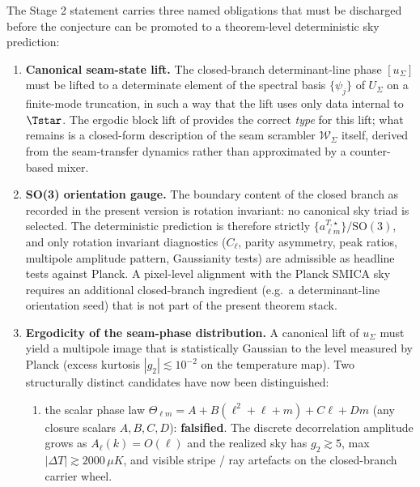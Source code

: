 
\begin{remark}
\label{rem:stage2-open-obligations}
The Stage 2 statement  carries three named obligations that
must be discharged before the conjecture can be promoted to a theorem-level deterministic sky
prediction:
\begin{enumerate}[label=(O\arabic*),leftmargin=2.4em,topsep=3pt,itemsep=2pt]
\item \textbf{Canonical seam-state lift.} The closed-branch determinant-line phase $[u_\Sigma]$
must be lifted to a determinate element of the spectral basis $\{\psi_j\}$ of $U_\Sigma$ on a
finite-mode truncation, in such a way that the lift uses only data internal to $\Tstar$. The
ergodic block lift of  provides the correct \emph{type} for
this lift; what remains is a closed-form description of the seam scrambler $\mathcal W_\Sigma$
itself, derived from the seam-transfer dynamics rather than approximated by a counter-based mixer.
\item \textbf{SO(3) orientation gauge.} The boundary content of the closed branch as recorded in
the present version is rotation invariant: no canonical sky triad is selected. The deterministic
prediction is therefore strictly $\{a_{\ell m}^{T,\star}\}/\mathrm{SO}(3)$, and only rotation
invariant diagnostics
($C_\ell$, parity asymmetry, peak ratios, multipole amplitude pattern, Gaussianity tests) are
admissible as headline tests against Planck. A pixel-level alignment with the Planck SMICA sky
requires an additional closed-branch ingredient (e.g.\ a determinant-line orientation seed) that
is not part of the present theorem stack.
\item \textbf{Ergodicity of the seam-phase distribution.} A canonical lift of $u_\Sigma$ must
yield a multipole image that is statistically Gaussian to the level measured by Planck (excess
kurtosis $|g_2|\lesssim 10^{-2}$ on the temperature map). Two structurally distinct candidates
have now been distinguished:
\begin{enumerate}[label=(\alph*),leftmargin=2em,topsep=2pt,itemsep=1pt]
\item the scalar phase law $\Theta_{\ell m}=A+B(\ell^2+\ell+m)+C\ell+Dm$ (any closure scalars
$A,B,C,D$): \textbf{falsified}. The discrete decorrelation amplitude grows as $A_\ell(k)=O(\ell)$
and the realized sky has $g_2\gtrsim 5$, max $|\Delta T|\gtrsim 2000\,\mu K$, and visible
stripe / ray artefacts on the closed-branch carrier wheel.

\end{enumerate}
\end{enumerate}
\end{remark}
